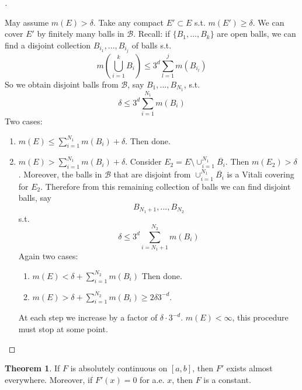 \documentclass{article}
\theoremstyle{definition}
\newtheorem{thm}{Theorem}
\newenvironment{proofs}[1][\proofname]{%
  \begin{proof}[#1]$ $\par\nobreak\ignorespaces
}{%
  \end{proof}
}
\begin{document}
\begin{proofs}
  May assume $m(E) > \delta$. Take any compact $E' \subset E$ s.t. $m(E') \geq \delta$. We can cover $E'$ by finitely many balls in $\mathcal{B}$. Recall: if $\{B_1, ..., B_k\}$ are open balls, we can find a disjoint collection $B_{i_1}, ..., B_{i_j}$ of balls s.t.
  \[
    m\left(\bigcup_{i = 1}^k B_i\right) \leq 3^d \sum_{l = 1}^j m(B_{i_l})
  \]
  So we obtain disjoint balls from $\mathcal{B}$, say $B_1, ..., B_{N_1}$, s.t.
  \[
    \delta \leq 3^d \sum_{i = 1}^{N_1} m(B_i)
  \]
  Two cases:
  \begin{enumerate}
    \item $m(E) \leq \sum_{i = 1}^{N_1} m(B_i) + \delta$. Then done.
    \item $m(E) > \sum_{i = 1}^{N_1} m(B_i) + \delta$. Consider $E_2 = E \setminus \cup_{i = 1}^{N_1} \overline{B_i}$. Then $m(E_2) > \delta$. Moreover, the balls in $\mathcal{B}$ that are disjoint from $\cup_{i = 1}^{N_1} \overline{B_i}$ is a Vitali covering for $E_2$. Therefore from this remaining collection of balls we can find disjoint balls, say
      \[
        B_{N_1 + 1}, ..., B_{N_2}
      \]
      s.t.
      \[
        \delta \leq 3^d \sum_{i = N_1 + 1}^{N_2} m(B_i)
      \]
      Again two cases:
      
      \begin{enumerate}
        \item $m(E) < \delta + \sum_{i =1}^{N_2} m(B_i)$ Then done.
        \item $m(E) > \delta + \sum_{i = 1}^{N_2} m(B_i) \geq 2 \delta 3^{-d}$. 
      \end{enumerate}

      At each step we increase by a factor of $\delta \cdot 3^{-d}$. $m(E) < \infty$, this procedure must stop at some point. 
  \end{enumerate}
\end{proofs}

\begin{thm}
  If $F$ is absolutely continuous on $[a, b]$, then $F'$ exists almost everywhere. Moreover, if $F'(x) = 0$ for a.e. $x$, then $F$ is a constant. 
\end{thm} 
\end{document}
